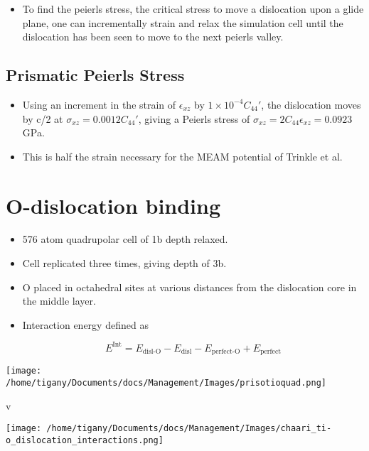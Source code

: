 \documentclass[11pt]{article}
\begin{document}
\begin{itemize}
\item To find the peierls stress, the critical stress to move a
dislocation upon a glide plane, one can incrementally strain and
relax the simulation cell until the dislocation has been seen to
move to the next peierls valley.
\end{itemize}

\subsection*{Prismatic Peierls Stress}
\label{sec:org7eb3317}

\begin{itemize}
\item Using an increment in the strain of \(\epsilon_{xz}\) by \(1\times 10^{-4}C_{44}'\), the
dislocation moves by c/2 at \(\sigma_{xz}= 0.0012C_{44}'\), giving a Peierls stress of \(\sigma_{xz} =
     2C_{44}\epsilon_{xz}= 0.0923\) GPa.
\item This is half the strain necessary for the MEAM potential of
Trinkle et al.
\end{itemize}


\section*{O-dislocation binding}
\label{sec:org198c47d}

\begin{itemize}
\item 576 atom quadrupolar cell of 1b depth relaxed.
\item Cell replicated three times, giving depth of 3b.
\item O placed in octahedral sites at various distances from the
dislocation core in the middle layer.
\item Interaction energy defined as 

\[ E^{\text{Int}}_{} = E_{\text{disl-O}} -   E_{\text{disl}} -
    E_{\text{perfect-O}} + E_{\text{perfect}} \]
\end{itemize}

\begin{center}
\texttt{[image: /home/tigany/Documents/docs/Management/Images/prisotioquad.png]}
\end{center} v

\begin{center}
\texttt{[image: /home/tigany/Documents/docs/Management/Images/chaari\_ti-o\_dislocation\_interactions.png]}
\end{center}
\end{document}
